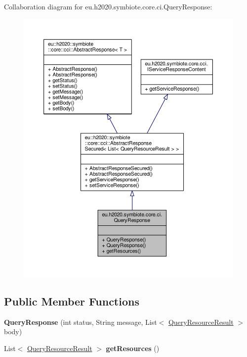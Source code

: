 Collaboration diagram for eu.\+h2020.\+symbiote.\+core.\+ci.\+Query\+Response\+:
\nopagebreak
\begin{figure}[H]
\begin{center}
\leavevmode
\includegraphics[width=350pt]{classeu_1_1h2020_1_1symbiote_1_1core_1_1ci_1_1QueryResponse__coll__graph}
\end{center}
\end{figure}
\subsection*{Public Member Functions}
\begin{DoxyCompactItemize}
\item 
\mbox{\label{classeu_1_1h2020_1_1symbiote_1_1core_1_1ci_1_1QueryResponse_a1f873efb29ed2e2279c360f44e9b7d9c}} 
{\bfseries Query\+Response} (int status, String message, List$<$ \hyperlink{classeu_1_1h2020_1_1symbiote_1_1core_1_1ci_1_1QueryResourceResult}{Query\+Resource\+Result} $>$ body)
\item 
\mbox{\label{classeu_1_1h2020_1_1symbiote_1_1core_1_1ci_1_1QueryResponse_ac5c0b66275ca9f7a0f8f01d2f38b9ccc}} 
List$<$ \hyperlink{classeu_1_1h2020_1_1symbiote_1_1core_1_1ci_1_1QueryResourceResult}{Query\+Resource\+Result} $>$ {\bfseries get\+Resources} ()
\end{DoxyCompactItemize}


